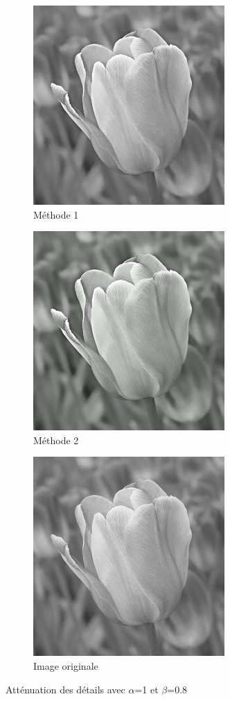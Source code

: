 \documentclass[twoside,UTF8]{EPURapport}
\begin{document}
\begin{figure}
        \centering
        \begin{subfigure}[b]{0.3\textwidth}
                \includegraphics[scale=0.45]{images/flower1_1_08.png} 
                \caption{Méthode 1}
        \end{subfigure}
        \qquad \qquad
        \begin{subfigure}[b]{0.3\textwidth}
                \includegraphics[scale=0.45]{images/flower2_1_08.png}
                \caption{Méthode 2}
        \end{subfigure}
        
        \begin{subfigure}[b]{0.3\textwidth}
                \includegraphics[scale=0.45]{images/flower.png}
             	\caption{Image originale}
        \end{subfigure}
        \caption{Atténuation des détails avec $\alpha$=1 et $\beta$=0.8}
\end{figure}
\end{document}
